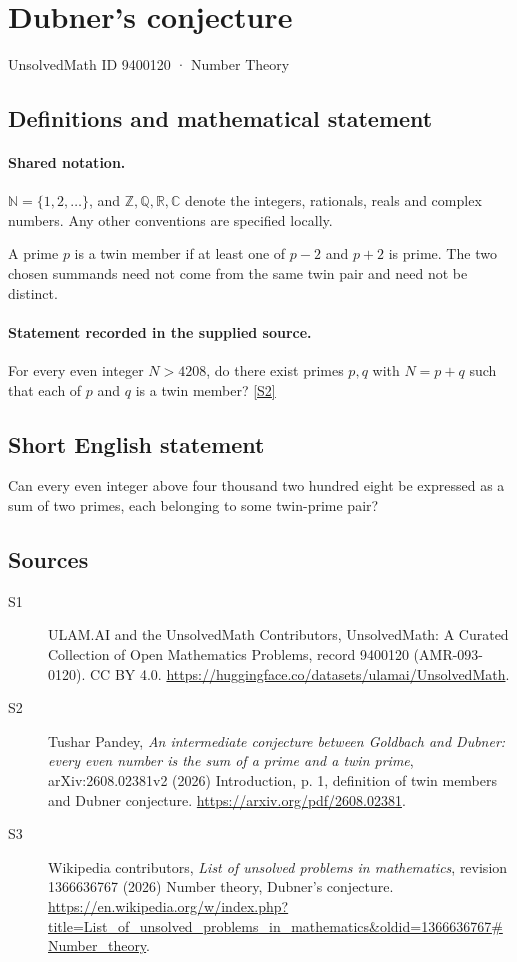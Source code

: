 \documentclass[11pt]{article}
\newcommand{\sref}[2]{\hyperlink{source:#1:#2}{[S#2]}}
\begin{document}
\setcounter{section}{9400119}
\section{Dubner's conjecture}\label{9400120}
{\small\sffamily UnsolvedMath ID 9400120 · Number Theory}
\subsection{Definitions and mathematical statement}

\paragraph{Shared notation.}$\mathbb N=\{1,2,\ldots\}$, and $\mathbb Z,\mathbb Q,\mathbb R,\mathbb C$ denote the integers, rationals, reals and complex numbers. Any other conventions are specified locally.


A prime $p$ is a twin member if at least one of $p-2$ and $p+2$ is prime. The two chosen summands need not come from the same twin pair and need not be distinct.
\paragraph{Statement recorded in the supplied source.}
For every even integer $N>4208$, do there exist primes $p,q$ with $N=p+q$ such that each of $p$ and $q$ is a twin member? \sref{9400120}{2}
\subsection{Short English statement}
Can every even integer above four thousand two hundred eight be expressed as a sum of two primes, each belonging to some twin-prime pair?
\subsection{Sources}
\begin{description}
\item[\hypertarget{source:9400120:1}{S1}] ULAM.AI and the UnsolvedMath Contributors, UnsolvedMath: A Curated Collection of Open Mathematics Problems, record 9400120 (AMR-093-0120). CC BY 4.0. \url{https://huggingface.co/datasets/ulamai/UnsolvedMath}.
\item[\hypertarget{source:9400120:2}{S2}] Tushar Pandey, \emph{An intermediate conjecture between Goldbach and Dubner: every even number is the sum of a prime and a twin prime}, arXiv:2608.02381v2 (2026) Introduction, p. 1, definition of twin members and Dubner conjecture. \url{https://arxiv.org/pdf/2608.02381}.
\item[\hypertarget{source:9400120:3}{S3}] Wikipedia contributors, \emph{List of unsolved problems in mathematics}, revision 1366636767 (2026) Number theory, Dubner's conjecture. \url{https://en.wikipedia.org/w/index.php?title=List_of_unsolved_problems_in_mathematics&oldid=1366636767#Number_theory}.
\end{description}
\label{end:9400120}
\end{document}
